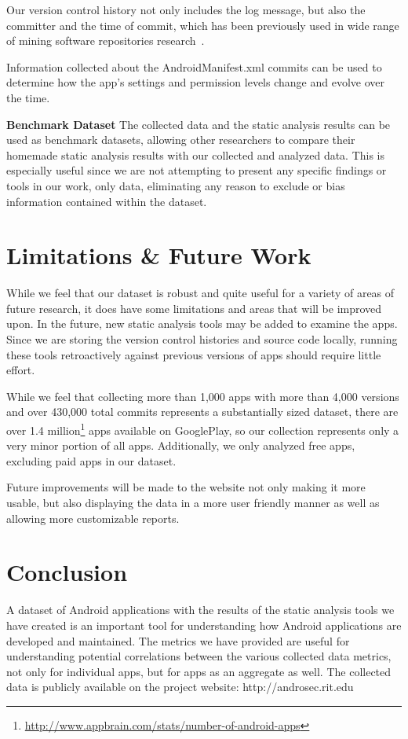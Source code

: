 \documentclass[conference]{IEEEtran}
\newcommand{\Sam}[1]{\textcolor{green}{{\it [Sam says: #1]}}}
\begin{document}
Our version control history not only includes the log message, but also the committer and the time of commit, which has been previously used in wide range of mining software repositories research~\cite{Eyolfson:2011:TDD:1985441.1985464, bachmann2010missing, Buse:2010:ADP:1858996.1859005, Dallmeier:2007:EBL:1321631.1321702}.

Information collected about the AndroidManifest.xml commits can be used to determine how the app's settings and permission levels change and evolve over the time.

\textbf{Benchmark Dataset}
The collected data and the static analysis results can be used as benchmark datasets, allowing other researchers to compare their homemade static analysis results with our collected and analyzed data. This is especially useful since we are not attempting to present any specific findings or tools in our work, only data, eliminating any reason to exclude or bias information contained within the dataset.


\section{Limitations \& Future Work}
\label{sec: Limitations}

While we feel that our dataset is robust and quite useful for a variety of areas of future research, it does have some limitations and areas that will be improved upon. In the future, new static analysis tools may be added to examine the apps. Since we are storing the version control histories and source code locally, running these tools retroactively against previous versions of apps should require little effort.

While we feel that collecting more than 1,000 apps with more than 4,000 versions and over 430,000 total commits represents a substantially sized dataset, there are over 1.4 million\footnote{\url{http://www.appbrain.com/stats/number-of-android-apps}} apps available on GooglePlay, so our collection represents only a very minor portion of all apps. Additionally, we only analyzed free apps, excluding paid apps in our dataset.

Future improvements will be made to the website not only making it more usable, but also displaying the data in a more user friendly manner as well as allowing more customizable reports.


\section{Conclusion}
\label{sec: conclusion}

A dataset of Android applications with the results of the static analysis tools we have created is an important tool for understanding how Android applications are developed and maintained. The metrics we have provided are useful for understanding potential correlations between the various collected data metrics, not only for individual apps, but for apps as an aggregate as well. The collected data is publicly available on the project website: http://androsec.rit.edu

\balance



\end{document}

